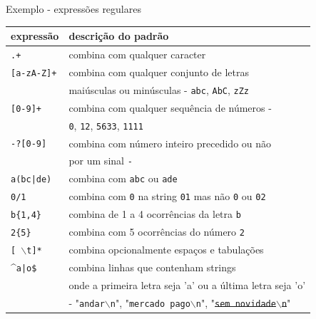 \begin{frame}{Exemplo - expressões regulares}

 \footnotesize
 \center
 \begin{tabular}{ll}
   \toprule
   \bf expressão & \bf          descrição do padrão\\
   \midrule
   {\tt .+}      &           combina com qualquer caracter\\
   {\tt [a-zA-Z]+} &         combina com qualquer conjunto de letras\\
                 &    maiúsculas ou minúsculas - {\tt abc}, {\tt AbC}, {\tt zZz}\\
   {\tt [0-9]+}      &       combina com qualquer sequência de números -\\
                 &  {\tt 0}, {\tt 12}, {\tt 5633}, {\tt 1111}\\
   {\tt -?[0-9]}        &     combina com número inteiro precedido ou não\\
                 & por um sinal {\tt -}\\
   {\tt a(bc|de)}      &     combina com {\tt abc} ou {\tt ade}\\
   {\tt 0/1}            &    combina com {\tt 0} na string {\tt 01} mas não {\tt 0} ou {\tt 02}\\
   {\tt b\{1,4\}}          &   combina de 1 a 4 ocorrências da letra {\tt b}\\
   {\tt 2\{5\}}            &   combina com 5 ocorrências do número {\tt 2}\\
   {\tt [ $\backslash$t]*} &   combina opcionalmente espaços e tabulações\\
   \^{}{\tt a|o\$}          &    combina linhas que contenham strings\\
                 & onde a primeira letra seja 'a' ou a última letra seja 'o'\\
                 & - "{\tt andar$\backslash$n}", "{\tt mercado pago$\backslash$n}", "\sout{{\tt sem novidade$\backslash$n}}"\\
   \bottomrule
 \end{tabular}
\end{frame}

